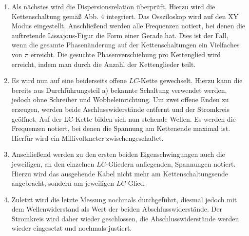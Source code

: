\begin{enumerate}
\item Als nächstes wird die Dispersionsrelation überprüft. Hierzu wird die
 Kettenschaltung gemäß Abb. 4 integriert. Das Ossziloskop
  wird auf den XY Modus eingestellt. Anschließend werden alle Frequenzen notiert,
    bei denen die auftretende Lissajous-Figur die Form einer Gerade hat. Dies ist der
     Fall, wenn die gesamte Phasenänderung auf der Kettenschaltungen ein
      Vielfaches von $\pi$ erreicht. Die gesuchte Phasenverschiebung pro Kettenglied
       wird erreicht, indem man durch die Anzahl der Kettenglieder teilt.

\item Es wird nun auf eine beiderseits offene $LC$-Kette gewechselt. Hierzu kann
 die bereits aus Durchführungsteil a) bekannte Schaltung verwendet werden,
  jedoch ohne Schreiber und Wobbeleinrichtung. Um zwei offene Enden zu
   erzeugen, werden beide Aschlusswiderstände entfernt und der Stromkreis geöffnet.
    Auf der LC-Kette bilden sich nun stehende Wellen.
   Es werden die Frequenzen notiert, bei denen die Spannung am Kettenende
    maximal ist. Hierfür wird ein Millivoltmeter zwischengeschaltet.

\item Anschließend werden zu den ersten beiden Eigenschwingungen auch die
 jeweiligen, an den einzelnen $LC$-Gliedern anliegenden, Spannungen notiert. Hierzu wird
  das ausgehende Kabel nicht mehr am Kettenschaltungsende angebracht, sondern
   am jeweiligen $LC$-Glied.

   \item Zuletzt wird die letzte Messung nochmals durchgeführt, diesmal jedoch
    mit dem Wellenwiderstand als Wert der beiden Abschlusswiderstände.
    Der Stromkreis wird daher wieder geschlossen, die Abschlusswiderstände werden
     wieder eingesetzt und nochmals justiert.


\end{enumerate}
